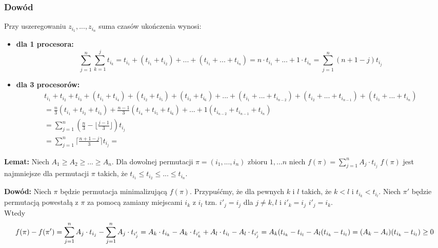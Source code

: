 \subsubsection{Dowód}
Przy uszeregowaniu $z_{i_1} ,..., z_{i_n}$ suma czasów ukończenia wynosi:
\begin{itemize}
	\item \textbf{dla 1 procesora:}
	\[ \sum_{j=1}^{n} \sum_{k=1}^{j} t_{i_k} = t_{i_1} + (t_{i_1}+ t_{i_2}) + ... + (t_{i_1} + ... + t_{i_n}) = n \cdot t_{i_1} + ... + 1 \cdot t_{i_n} = \sum_{j=1}^{n} (n+1-j) t_{i_j}  \]
    \item \textbf{dla 3 procesorów:} \\
    \begin{equation}
    \begin{multlined}
    t_{i_1} + t_{i_2} + t_{i_3} + (t_{i_1}+ t_{i_4}) + (t_{i_2}+ t_{i_5}) + (t_{i_3}+ t_{i_6}) + ... + (t_{i_1} + ... + t_{i_{n-2}}) + (t_{i_2} + ... + t_{i_{n-1}}) + (t_{i_3} + ... + t_{i_n}) \\
= \frac{n}{3} (t_{i_1} + t_{i_2} + t_{i_3}) + \frac{n-1}{3} (t_{i_4} + t_{i_5} + t_{i_6}) + ... + 1 (t_{i_{n-2}} + t_{i_{n-1}} + t_{i_{n}}) \\
= \sum_{j=1}^{n} (\frac{n}{3} - \lfloor\frac{j-1}{3}\rfloor) t_{i_j} \\
= \sum_{j=1}^{n} \lceil \frac{n + 1 -j}{3} \rceil t_{i_j} =  
	\end{multlined}
	\end{equation}
\end{itemize}

\textbf{Lemat:} Niech $A_1 \geq A_2 \geq ... \geq A_n$. Dla dowolnej permutacji $\pi = (i_1, ..., i_n)$ zbioru ${1,...n}$ niech $f(\pi) = \sum_{j=1}^{n} A_j \cdot t_{i_j}$ $f(\pi)$ jest najmniejsze dla permutacji $\pi$ takich, że $t_{i_1} \leq t_{i_2} \leq ... \leq t_{i_n}$.

\textbf{Dowód:} Niech $\pi$ będzie permutacja minimalizującą $f(\pi)$. Przypuśćmy, że dla pewnych $k$ i $l$ takich, że $k<l$ i $t_{i_k} < t_{i_l}$. Niech $\pi'$ będzie permutacją powestałą z $\pi$ za pomocą zamiany miejscami $i_k$ z $i_l$ tzn. $i'_j = i_j$ dla $j\neq k,l$ i $i'_k = i_j$ $i'_j = i_k$. \\
Wtedy
$$f(\pi) - f(\pi') = \sum_{j=1}^{n} A_j \cdot t_{i_j} - \sum_{j=1}^{n} A_j  \cdot t_{i'_j} \\
= A_k \cdot t_{i_k} - A_k \cdot t_{i'_k} + A_l \cdot t_{i_l} - A_l \cdot t_{i'_j} \\
=A_k(t_{i_k} - t_{i_l} - A_l(t_{i_k} - t_{i_l}) = (A_k - A_i)(t_{i_k} - t_{i_l}) \geq 0$$


